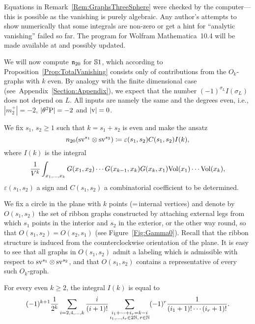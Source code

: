 \documentclass[\MainFolder/Text.tex]{subfiles}
\begin{document}
Equations in Remark~\ref{Rem:GraphsThreeSphere} were checked by the computer---this is possible as the vanishing is purely algebraic.
Any author's attempts to show numerically that some integrals are non-zero or get a hint for ``analytic vanishing'' failed so far.
The program for Wolfram Mathematica~10.4 will be made available at \cite{sourcecode} and possibly updated. 


We will now compute $\mathfrak{n}_{20}$ for $\mathbb{S}{1}$, which according to Proposition~\ref{Prop:TotalVanishing} consists only of contributions from the $O_k$-graphs with $k$ even. 
By analogy with the finite dimensional case (see~Appendix~\ref{Section:Appendix}), we expect that the number $(-1)^{\sigma_L}I(\sigma_L)$ does not depend on $L$. All inputs are namely the same and the degrees even, i.e., $|m_2^+| = -2$, $|\theta^2\mathrm{P}| = -2$ and $|\mathrm{v}| = 0$. 

We fix $s_1$, $s_2\ge 1$ such that $k=s_1+s_2$ is even and make the ansatz
\begin{equation*}
n_{20}(\mathrm{s} \mathrm{v}^{s_1}\otimes  \mathrm{s} \mathrm{v}^{s_2}) \coloneqq \varepsilon(s_1,s_2) C(s_1,s_2) I(k),
\end{equation*}
where $I(k)$ is the integral
\begin{equation} \label{Eq:Ik}
\frac{1}{V^k}\int_{x_1, \dotsc, x_{k}} G(x_1,x_2) \dotsm G(x_{k-1},x_{k})G(x_{k},x_1)\mathrm{Vol}(x_1) \dotsm \mathrm{Vol}(x_{k}), \end{equation}
$\varepsilon(s_1,s_2)$ a sign and $C(s_1,s_2)$ a combinatorial coefficient to be determined.

We fix a circle in the plane with $k$ points (=\,internal vertices) and denote by $O(s_1,s_2)$ the set of ribbon graphs constructed by attaching external legs from which $s_1$ points in the interior and $s_2$ in the exterior, or the other way round, so that $O(s_1,s_2) = O(s_2, s_1)$ (see Figure~\ref{Fig:Gamma0}). Recall that the ribbon structure is induced from the counterclockwise orientation of the plane. It is easy to see that all graphs in $O(s_1,s_2)$ admit a labeling which is admissible with respect to $\mathrm{s} \mathrm{v}^{s_1} \otimes \mathrm{s} \mathrm{v}^{s_2}$, and that $O(s_1,s_2)$ contains a representative of every such $O_k$-graph. 

\begin{Lemma} \label{Lemma:IntegralFor1}
For every even $k\ge 2$, the integral $I(k)$ is equal to
 \begin{equation}\label{Eq:TheFormulaForIk}
 (-1)^{k+1} \frac{1}{2^k}\sum_{i=2, 4, \dotsc ,k} \frac{i}{(i+1)!} \sum_{\substack{i_1+ \dotsb +i_r = k-i \\ i_1, \dotsc, i_r \in 2\mathbb{N},\, r\in \mathbb{N}}} (-1)^r \frac{1}{(i_1+1)! \dotsm (i_r+1)!}.
 \end{equation}
\end{Lemma}
\end{document}
